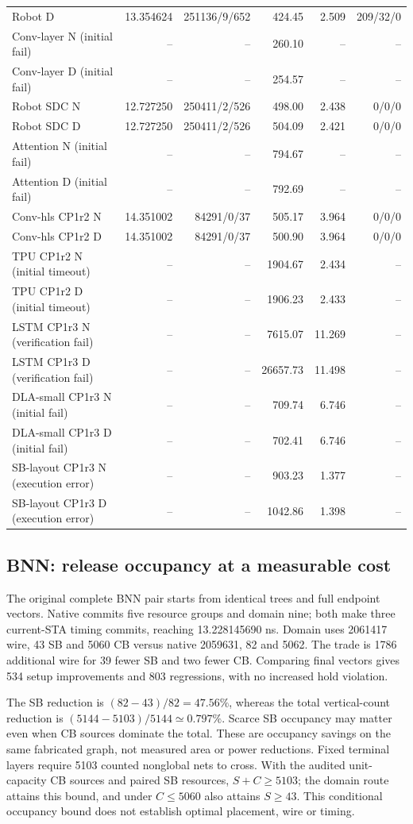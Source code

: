 \documentclass[conference,10pt]{IEEEtran}
\begin{document}
\begin{table}[t]
\begin{tabular}{lrrrrr}
Robot D&13.354624&251136/9/652&424.45&2.509&209/32/0\\
Conv-layer N (initial fail)&--&--&260.10&--&--\\
Conv-layer D (initial fail)&--&--&254.57&--&--\\
Robot SDC N&12.727250&250411/2/526&498.00&2.438&0/0/0\\
Robot SDC D&12.727250&250411/2/526&504.09&2.421&0/0/0\\
Attention N (initial fail)&--&--&794.67&--&--\\
Attention D (initial fail)&--&--&792.69&--&--\\
Conv-hls CP1r2 N&14.351002&84291/0/37&505.17&3.964&0/0/0\\
Conv-hls CP1r2 D&14.351002&84291/0/37&500.90&3.964&0/0/0\\
TPU CP1r2 N (initial timeout)&--&--&1904.67&2.434&--\\
TPU CP1r2 D (initial timeout)&--&--&1906.23&2.433&--\\
LSTM CP1r3 N (verification fail)&--&--&7615.07&11.269&--\\
LSTM CP1r3 D (verification fail)&--&--&26657.73&11.498&--\\
DLA-small CP1r3 N (initial fail)&--&--&709.74&6.746&--\\
DLA-small CP1r3 D (initial fail)&--&--&702.41&6.746&--\\
SB-layout CP1r3 N (execution error)&--&--&903.23&1.377&--\\
SB-layout CP1r3 D (execution error)&--&--&1042.86&1.398&--\\
\hline\end{tabular}
\end{table}

\subsection{BNN: release occupancy at a measurable cost}
The original complete BNN pair starts from identical trees and full endpoint vectors. Native commits five resource groups and domain nine; both make three current-STA timing commits, reaching 13.228145690 ns. Domain uses 2061417 wire, 43 SB and 5060 CB versus native 2059631, 82 and 5062. The trade is 1786 additional wire for 39 fewer SB and two fewer CB. Comparing final vectors gives 534 setup improvements and 803 regressions, with no increased hold violation.

The SB reduction is $(82-43)/82=47.56\%$, whereas the total vertical-count reduction is $(5144-5103)/5144\simeq0.797\%$. Scarce SB occupancy may matter even when CB sources dominate the total. These are occupancy savings on the same fabricated graph, not measured area or power reductions. Fixed terminal layers require 5103 counted nonglobal nets to cross. With the audited unit-capacity CB sources and paired SB resources, $S+C\ge5103$; the domain route attains this bound, and under $C\le5060$ also attains $S\ge43$. This conditional occupancy bound does not establish optimal placement, wire or timing.
\end{document}
